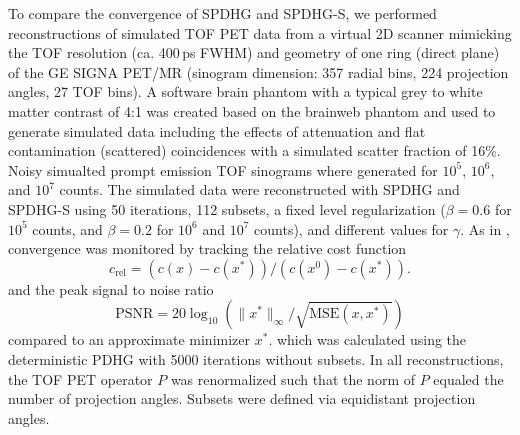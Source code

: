 \documentclass[11pt,twocolumn,twoside]{article}
\begin{document}
To compare the convergence of SPDHG and SPDHG-S, we performed reconstructions of simulated
TOF PET data from a virtual 2D scanner mimicking the TOF resolution (ca. 400\,ps FWHM) and 
geometry of one ring (direct plane) of the GE SIGNA PET/MR (sinogram dimension: 
357 radial bins, 224 projection angles, 27 TOF bins).
A software brain phantom with a typical grey to white matter contrast of 4:1 was created
based on the brainweb phantom and used to generate simulated data including the effects
of attenuation and flat contamination (scattered) coincidences
with a simulated scatter fraction of 16\%.
Noisy simualted prompt emission TOF sinograms where generated for $10^5$, $10^6$, 
and $10^7$ counts. %
The simulated data were reconstructed with SPDHG and SPDHG-S using 50 iterations, 112 subsets,
a fixed level regularization ($\beta = 0.6$ for $10^5$ counts, and $\beta = 0.2$ for $10^6$
and $10^7$ counts), and different values for $\gamma$.
As in \cite{Ehrhardt2019}, convergence was monitored by tracking the relative cost function
\[ c_\text{rel} = (c(x) - c(x^*)) / (c(x^0) - c(x^*)). \]
and the peak signal to noise ratio 
\[ \text{PSNR} = 20 \log_{10} (\|x^*\|_\infty/\sqrt{\text{MSE}(x,x^*)}) \]
compared to an approximate minimizer $x^*$.
which was calculated using the deterministic PDHG with 5000 iterations without subsets.
In all reconstructions, the TOF PET operator $P$ was renormalized such that the norm of $P$
equaled the number of projection angles.
Subsets were defined via equidistant projection angles.


\printbibliography
\end{document}
